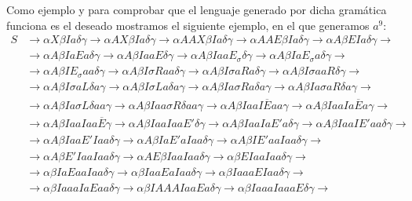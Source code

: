 \begin{ejercicio}
\begin{enumerate}
            Como ejemplo y para comprobar que el lenguaje generado por dicha gramática funciona es el deseado mostramos el siguiente ejemplo, en el que generamos $a^9$:
            \begin{align*}
                S &\rightarrow \alpha X \beta I a \delta\gamma \rightarrow \alpha AX\beta Ia\delta\gamma \rightarrow \alpha AAX\beta Ia\delta\gamma \rightarrow \alpha AAE \beta Ia \delta\gamma \rightarrow \alpha A \beta E Ia\delta\gamma \rightarrow \\
                  &\rightarrow \alpha A\beta IaEa\delta\gamma \rightarrow \alpha A\beta IaaE\delta\gamma \rightarrow \alpha A\beta IaaE_{\sigma}\delta\gamma \rightarrow \alpha A\beta IaE_{\sigma}a\delta\gamma \rightarrow \\ 
                  &\rightarrow\alpha A\beta IE_{\sigma}aa\delta\gamma \rightarrow \alpha A\beta I\sigma Raa\delta\gamma \rightarrow \alpha A\beta I \sigma aRa \delta\gamma \rightarrow \alpha A \beta I \sigma aaR \delta\gamma\rightarrow \\
                  &\rightarrow \alpha A\beta I\sigma aL\delta a\gamma \rightarrow \alpha A \beta I\sigma L a\delta a\gamma \rightarrow \alpha A \beta I a\sigma R a \delta a\gamma  \rightarrow \alpha A \beta Ia\sigma aR\delta a\gamma \rightarrow \\
                  &\rightarrow \alpha A \beta I a\sigma L\delta aa \gamma \rightarrow \alpha A \beta Iaa \sigma R \delta aa \gamma \rightarrow \alpha A\beta IaaI\overline{E}aa\gamma \rightarrow \alpha A \beta IaaIa\overline{E}a\gamma \rightarrow \\
                  &\rightarrow \alpha A\beta IaaIaa\overline{E} \gamma \rightarrow \alpha A \beta IaaIaaE'\delta \gamma \rightarrow \alpha A\beta IaaIaE'a\delta\gamma \rightarrow \alpha A\beta IaaIE'aa\delta\gamma \rightarrow \\
                  &\rightarrow \alpha A\beta IaaE'Iaa\delta\gamma \rightarrow \alpha A \beta IaE'aIaa\delta\gamma \rightarrow \alpha A\beta IE'aaIaa\delta\gamma \rightarrow \\
                  &\rightarrow \alpha A \beta E'IaaIaa\delta\gamma \rightarrow \alpha AE\beta IaaIaa\delta\gamma \rightarrow \alpha \beta E IaaIaa\delta \gamma \rightarrow \\
                  &\rightarrow \alpha\beta IaEaaIaa\delta\gamma\rightarrow \alpha\beta IaaEaIaa\delta\gamma\rightarrow\alpha\beta IaaaEIaa\delta\gamma\rightarrow \\
                  &\rightarrow \alpha\beta IaaaIaEaa\delta\gamma\rightarrow\alpha\beta IAAAIaaEa\delta\gamma\rightarrow \alpha\beta IaaaIaaaE\delta\gamma\rightarrow \\

\end{align*}
\end{enumerate}
\end{ejercicio}
